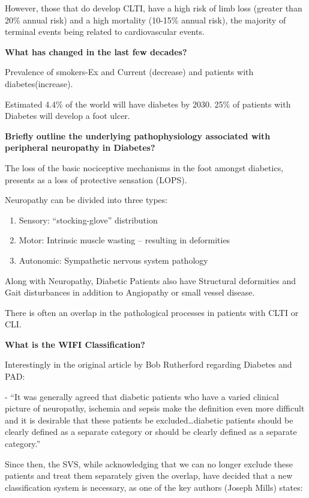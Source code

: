 \documentclass[
]{book}
\begin{document}
However, those that do develop CLTI, have a high risk of limb loss
(greater than 20\% annual risk) and a high mortality (10-15\% annual
risk), the majority of terminal events being related to cardiovascular
events.

\textbf{What has changed in the last few decades?}

Prevalence of smokers-Ex and Current (decrease) and patients with
diabetes(increase).

Estimated 4.4\% of the world will have diabetes by 2030. 25\% of patients
with Diabetes will develop a foot ulcer.

\textbf{Briefly outline the underlying pathophysiology associated with
peripheral neuropathy in Diabetes?}

The loss of the basic nociceptive mechanisms in the foot amongst
diabetics, presents as a loss of protective sensation (LOPS).

Neuropathy can be divided into three types:

\begin{enumerate}
\def\labelenumi{\arabic{enumi}.}
\item
  Sensory: ``stocking-glove'' distribution
\item
  Motor: Intrinsic muscle wasting -- resulting in deformities
\item
  Autonomic: Sympathetic nervous system pathology
\end{enumerate}

Along with Neuropathy, Diabetic Patients also have Structural
deformities and Gait disturbances in addition to Angiopathy or small
vessel disease.

There is often an overlap in the pathological processes in patients with
CLTI or CLI.

\textbf{What is the WIFI Classification?} \citep{millsSocietyVascularSurgery2014a}

Interestingly in the original article by Bob Rutherford regarding
Diabetes and PAD:

- ``It was generally agreed that diabetic patients who have a varied
clinical picture of neuropathy, ischemia and sepsis make the definition
even more difficult and it is desirable that these patients be
excluded\ldots diabetic patients should be clearly defined as a separate
category or should be clearly defined as a separate category.''

Since then, the SVS, while acknowledging that we can no longer exclude
these patients and treat them separately given the overlap, have decided
that a new classification system is necessary, as one of the key authors
(Joseph Mills) states:
\end{document}

